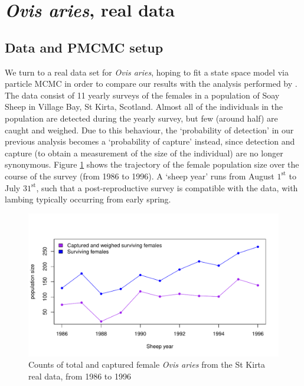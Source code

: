 \documentclass[a4paper,12pt]{article}
\begin{document}
\newpage
\section{\textit{Ovis aries}, real data}
\subsection{Data and PMCMC setup}
We turn to a real data set for \textit{Ovis aries}, hoping to fit a state space model via particle MCMC in order to compare our results with the analysis performed by \citet{Coulson2012}. The data consist of 11 yearly surveys of the females in a population of Soay Sheep in Village Bay, St Kirta, Scotland. Almost all of the individuals in the population are detected during the yearly survey, but few (around half) are caught and weighed. Due to this behaviour, the `probability of detection' in our previous analysis becomes a `probability of capture' instead, since detection and capture (to obtain a measurement of the size of the individual) are no longer synonymous. Figure \ref{sheepTS} shows the trajectory of the female population size over the course of the survey (from 1986 to 1996). A `sheep year' runs from August $1^\text{st}$ to July $31^\text{st}$, such that a post-reproductive survey is compatible with the data, with lambing typically occurring from early spring.

\begin{figure}[H]
\centering
\includegraphics[scale=0.8]{dataTimeSeries.pdf}
\caption{\label{sheepTS}Counts of total and captured female \textit{Ovis aries} from the St Kirta real data, from 1986 to 1996}
\end{figure}
\end{document}
